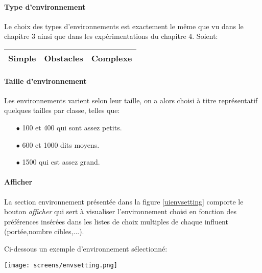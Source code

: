 \paragraph{Type d'environnement}
Le choix des types d'environnements est exactement le même que vu dans le chapitre 3 ainsi que dans les expérimentations du chapitre 4. Soient:

\begin{table}[h]
	\centering
	\begin{tabular}{|c|c|c|} 
		\hline
		Simple &  Obstacles & Complexe \\
		\hline
	\end{tabular}
	\captionsetup{width=1\linewidth}
	\vspace{-0.1cm}
	\label{TypeEnv}
\end{table}

\vspace{-0.5cm}
\paragraph{Taille d'environnement}
Les environnements varient selon leur taille, on a alors choisi à titre représentatif quelques tailles par classe, telles que:
\begin{itemize}
	\item  [$\bullet$]100 et 400 qui sont assez petits.
	\item  [$\bullet$]600 et 1000 dits moyens.
	\item  [$\bullet$]1500 qui est assez grand.
\end{itemize}

\paragraph{Afficher}
La section environnement présentée dans la figure \ref{uienvsetting} comporte le bouton \textit{afficher} qui sert à visualiser l'environnement choisi en fonction des préférences insérées dans les listes de choix multiples de chaque influent (portée,nombre cibles,...). 

Ci-dessous un exemple d'environnement sélectionné:
\begin{center}	  
	\captionsetup{width=1\linewidth}
	\texttt{[image: screens/envsetting.png]}%
	\vspace{-0.1 cm}
	\label{uienvsetting}%
\end{center}

